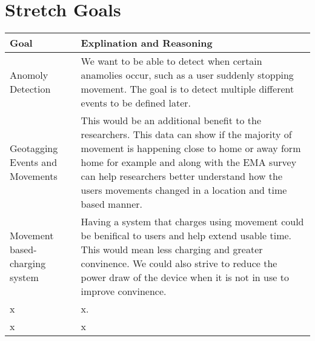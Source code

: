 \documentclass{article}
\begin{document}
\section{Stretch Goals}
\begin{center}
\begin{tabular}{ | m{7em} | m{33em}| } 
    \hline
    \textbf{Goal} & \textbf{Explination and Reasoning} \\
    \hline
    Anomoly Detection & We want to be able to detect when certain anamolies occur, such as a user suddenly stopping movement. The goal is to detect multiple different events to be defined later. \\ 
    \hline
    Geotagging Events and Movements & This would be an additional benefit to the researchers. This data can show if the majority of movement is happening close to home or away form home for example and along with the EMA survey can help researchers better understand how the users movements changed in a location and time based manner.  \\ 
    \hline
    Movement based-charging system & Having a system that charges using movement could be benifical to users and help extend usable time. This would mean less charging and greater convinence. We could also strive to reduce the power draw of the device when it is not in use to improve convinence.  \\ 
    \hline
	x & x. \\
	\hline
	x & x \\ 
	\hline
\end{tabular}
\end{center}
\end{document}
